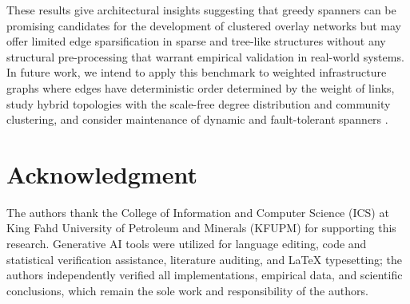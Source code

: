 \documentclass[conference]{IEEEtran}
\begin{document}
These results give architectural insights suggesting that greedy spanners can be promising candidates for the development of clustered overlay networks but may offer limited edge sparsification in sparse and tree-like structures without any structural pre-processing that warrant empirical validation in real-world systems. In future work, we intend to apply this benchmark to weighted infrastructure graphs where edges have deterministic order determined by the weight of links, study hybrid topologies with the scale-free degree distribution and community clustering, and consider maintenance of dynamic and fault-tolerant spanners \cite{ref26}.

\section*{Acknowledgment}
The authors thank the College of Information and Computer Science (ICS) at King Fahd University of Petroleum and Minerals (KFUPM) for supporting this research. Generative AI tools were utilized for language editing, code and statistical verification assistance, literature auditing, and LaTeX typesetting; the authors independently verified all implementations, empirical data, and scientific conclusions, which remain the sole work and responsibility of the authors.
\end{document}
